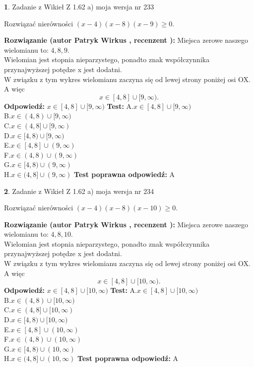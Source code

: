 \documentclass[12pt, a4paper]{article}
\theoremstyle{definition} %
\newtheorem{zad}{}
\newcommand{\zadStart}[1]{\begin{zad}#1\newline}
\newcommand{\zadStop}{\end{zad}}
\newcommand{\rozwStart}[2]{\noindent \textbf{Rozwiązanie (autor #1 , recenzent #2): }\newline}
\newcommand{\rozwStop}{\newline}
\newcommand{\odpStart}{\noindent \textbf{Odpowiedź:}\newline}
\newcommand{\odpStop}{\newline}
\newcommand{\testStart}{\noindent \textbf{Test:}\newline}
\newcommand{\testStop}{\newline}
\newcommand{\kluczStart}{\noindent \textbf{Test poprawna odpowiedź:}\newline}
\newcommand{\kluczStop}{\newline}
\begin{document}
\zadStart{Zadanie z Wikieł Z 1.62 a) moja wersja nr 233}

Rozwiązać nierówności $(x-4)(x-8)(x-9)\ge0$.
\zadStop
\rozwStart{Patryk Wirkus}{}
Miejsca zerowe naszego wielomianu to: $4, 8, 9$.\\
Wielomian jest stopnia nieparzystego, ponadto znak współczynnika przy\linebreak najwyższej potędze x jest dodatni.\\ W związku z tym wykres wielomianu zaczyna się od lewej strony poniżej osi OX. A więc $$x \in [4,8] \cup [9,\infty).$$
\rozwStop
\odpStart
$x \in [4,8] \cup [9,\infty)$
\odpStop
\testStart
A.$x \in [4,8] \cup [9,\infty)$\\
B.$x \in (4,8) \cup [9,\infty)$\\
C.$x \in (4,8] \cup [9,\infty)$\\
D.$x \in [4,8) \cup [9,\infty)$\\
E.$x \in [4,8] \cup (9,\infty)$\\
F.$x \in (4,8) \cup (9,\infty)$\\
G.$x \in [4,8) \cup (9,\infty)$\\
H.$x \in (4,8] \cup (9,\infty)$
\testStop
\kluczStart
A
\kluczStop



\zadStart{Zadanie z Wikieł Z 1.62 a) moja wersja nr 234}

Rozwiązać nierówności $(x-4)(x-8)(x-10)\ge0$.
\zadStop
\rozwStart{Patryk Wirkus}{}
Miejsca zerowe naszego wielomianu to: $4, 8, 10$.\\
Wielomian jest stopnia nieparzystego, ponadto znak współczynnika przy\linebreak najwyższej potędze x jest dodatni.\\ W związku z tym wykres wielomianu zaczyna się od lewej strony poniżej osi OX. A więc $$x \in [4,8] \cup [10,\infty).$$
\rozwStop
\odpStart
$x \in [4,8] \cup [10,\infty)$
\odpStop
\testStart
A.$x \in [4,8] \cup [10,\infty)$\\
B.$x \in (4,8) \cup [10,\infty)$\\
C.$x \in (4,8] \cup [10,\infty)$\\
D.$x \in [4,8) \cup [10,\infty)$\\
E.$x \in [4,8] \cup (10,\infty)$\\
F.$x \in (4,8) \cup (10,\infty)$\\
G.$x \in [4,8) \cup (10,\infty)$\\
H.$x \in (4,8] \cup (10,\infty)$
\testStop
\kluczStart
A
\kluczStop
\end{document}
